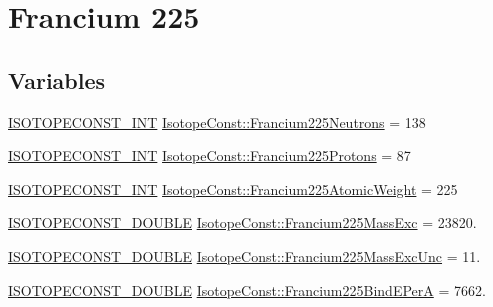 \hypertarget{group___isotope_const-_francium-_fr225}{}\section{Francium 225}
\label{group___isotope_const-_francium-_fr225}
\subsection*{Variables}
\begin{DoxyCompactItemize}
\item 
\mbox{\hyperlink{group___isotope_const-_macros_ga5f18360b3e99483a35c32d789e62621c}{I\+S\+O\+T\+O\+P\+E\+C\+O\+N\+S\+T\+\_\+\+I\+NT}} \mbox{\hyperlink{group___isotope_const-_francium-_fr225_gad99967a94df3a84cc91730ea10c2323f}{Isotope\+Const\+::\+Francium225\+Neutrons}} = 138
\item 
\mbox{\hyperlink{group___isotope_const-_macros_ga5f18360b3e99483a35c32d789e62621c}{I\+S\+O\+T\+O\+P\+E\+C\+O\+N\+S\+T\+\_\+\+I\+NT}} \mbox{\hyperlink{group___isotope_const-_francium-_fr225_ga03a07e87aadaec00c48a333607d33b89}{Isotope\+Const\+::\+Francium225\+Protons}} = 87
\item 
\mbox{\hyperlink{group___isotope_const-_macros_ga5f18360b3e99483a35c32d789e62621c}{I\+S\+O\+T\+O\+P\+E\+C\+O\+N\+S\+T\+\_\+\+I\+NT}} \mbox{\hyperlink{group___isotope_const-_francium-_fr225_ga13e6422259365f0a430d87f1fa4403ca}{Isotope\+Const\+::\+Francium225\+Atomic\+Weight}} = 225
\item 
\mbox{\hyperlink{group___isotope_const-_macros_ga8f45a7272ce02c0b4c65c44636ed719a}{I\+S\+O\+T\+O\+P\+E\+C\+O\+N\+S\+T\+\_\+\+D\+O\+U\+B\+LE}} \mbox{\hyperlink{group___isotope_const-_francium-_fr225_ga6eebdc1cffaa43f16ecb7547862a4bd1}{Isotope\+Const\+::\+Francium225\+Mass\+Exc}} = 23820.
\item 
\mbox{\hyperlink{group___isotope_const-_macros_ga8f45a7272ce02c0b4c65c44636ed719a}{I\+S\+O\+T\+O\+P\+E\+C\+O\+N\+S\+T\+\_\+\+D\+O\+U\+B\+LE}} \mbox{\hyperlink{group___isotope_const-_francium-_fr225_ga1bd18bf040ca4fd4582d1409361873d9}{Isotope\+Const\+::\+Francium225\+Mass\+Exc\+Unc}} = 11.
\item 
\mbox{\hyperlink{group___isotope_const-_macros_ga8f45a7272ce02c0b4c65c44636ed719a}{I\+S\+O\+T\+O\+P\+E\+C\+O\+N\+S\+T\+\_\+\+D\+O\+U\+B\+LE}} \mbox{\hyperlink{group___isotope_const-_francium-_fr225_ga70ce7114cdd05ceb183482e325bef62a}{Isotope\+Const\+::\+Francium225\+Bind\+E\+PerA}} = 7662.
\item 

\end{DoxyCompactItemize}
